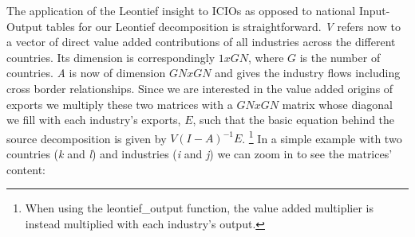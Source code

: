 \documentclass[a4paper]{article}\usepackage[]{graphicx}\usepackage[]{color}
\begin{document}
The application of the Leontief insight to ICIOs as opposed to national Input-Output tables for our Leontief decomposition is straightforward.
\textit{V} refers now to a vector of direct value added contributions of all industries across the different countries. 
Its dimension is correspondingly $1 x GN$, where $G$ is the number of countries.
\textit{A} is now of dimension $GN x GN$ and gives the industry flows including cross border relationships.
Since we are interested in the value added origins of exports we multiply these two matrices with a $GN x GN$ matrix whose diagonal we fill with each industry's exports, $E$, 
such that the basic equation behind the source decomposition is given by $V(I-A)^{-1}E$. 
\footnote{When using the leontief\_output function, the value added multiplier is instead multiplied with each industry's output.}
In a simple example with two countries (\textit{k} and \textit{l}) and industries (\textit{i} and \textit{j}) we can zoom in to see the matrices' content:
\end{document}
